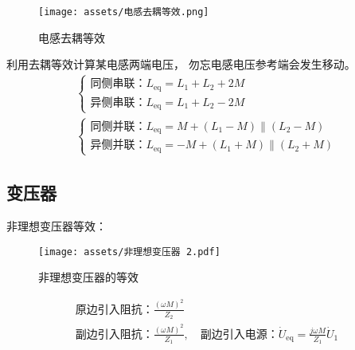 \documentclass[a4paper]{article}  %
\theoremstyle{MyLineTheoremStyle} %
\theoremstyle{MyBlockTheoremStyle} %
\theoremstyle{MySubsubsectionStyle} %
\begin{document}
\begin{multicols*}{4}
\begin{figure}[H]\centering
    \texttt{[image: assets/电感去耦等效.png]}
    \caption{电感去耦等效}
    \label{电感去耦等效}
\end{figure}

利用去耦等效计算某电感两端电压，{\color{red} 勿忘电感电压参考端会发生移动}。
\begin{gather}
    \begin{cases}
    \text{同侧串联：} L_{\text{eq}} = L_1 + L_2 + 2M \\
    \text{异侧串联：} L_{\text{eq}} = L_1 + L_2 - 2M
    \end{cases} \\
    \begin{cases}
    \text{同侧并联：} L_{\text{eq}} = M + (L_1 - M)\parallel(L_2 - M)\\
    \text{异侧并联：} L_{\text{eq}} = -M + (L_1 + M)\parallel(L_2 + M)
    \end{cases}
\end{gather}

\subsection{变压器}
非理想变压器等效：
\begin{figure}[H]\centering
    \texttt{[image: assets/非理想变压器 2.pdf]}
    \caption{非理想变压器的等效}
    \label{非理想变压器等效}
\end{figure}
\begin{gather}
\text{原边引入阻抗：} \frac{(\omega M)^2}{Z_2} \\
\text{副边引入阻抗：} \frac{(\omega M)^2}{Z_1},\quad 
\text{副边引入电源：} \dot{U}_{\text{eq}} = \frac{j \omega M}{Z_1} \dot{U}_1
\end{gather}


\end{multicols*}
\end{document}
